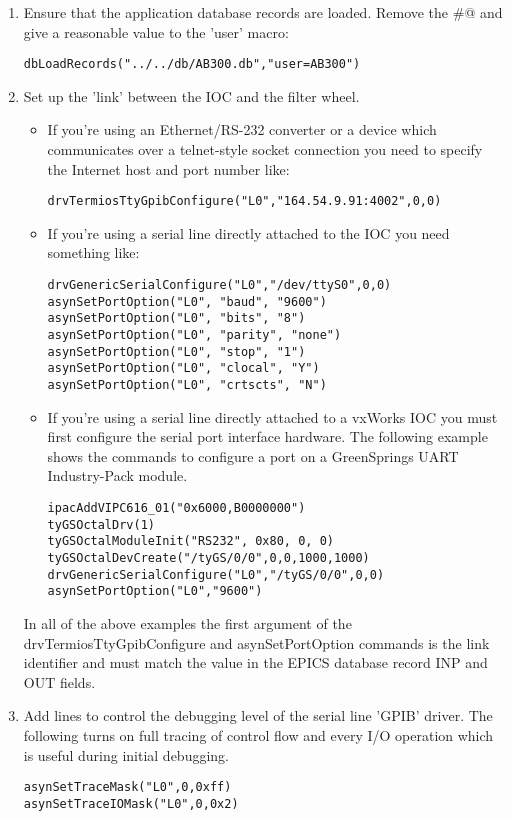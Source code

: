 \documentclass[twoside]{article}
\begin{document}
\begin{enumerate}
\item Ensure that the application database records are loaded.  Remove the
\verb@#@
and give a reasonable value to the 'user' macro:
\begin{verbatim}
dbLoadRecords("../../db/AB300.db","user=AB300")
\end{verbatim}

\item Set up the 'link' between the IOC and the filter wheel.
\begin{itemize}
\item If you're using
an Ethernet/RS-232 converter or a device which communicates over
a telnet-style socket connection you need to specify the Internet host and
port number like:
\begin{verbatim}
drvTermiosTtyGpibConfigure("L0","164.54.9.91:4002",0,0)
\end{verbatim}


\item If you're using a serial line directly attached to the IOC you need
something like:
\begin{verbatim}
drvGenericSerialConfigure("L0","/dev/ttyS0",0,0)
asynSetPortOption("L0", "baud", "9600")
asynSetPortOption("L0", "bits", "8")
asynSetPortOption("L0", "parity", "none")
asynSetPortOption("L0", "stop", "1")
asynSetPortOption("L0", "clocal", "Y")
asynSetPortOption("L0", "crtscts", "N")
\end{verbatim}

\item If you're using a serial line directly attached to a vxWorks IOC you must
first configure the serial port interface hardware.  The following example shows the
commands to configure a port on a GreenSprings UART Industry-Pack module.
\begin{verbatim}
ipacAddVIPC616_01("0x6000,B0000000")
tyGSOctalDrv(1)
tyGSOctalModuleInit("RS232", 0x80, 0, 0)
tyGSOctalDevCreate("/tyGS/0/0",0,0,1000,1000)
drvGenericSerialConfigure("L0","/tyGS/0/0",0,0)
asynSetPortOption("L0","9600")
\end{verbatim}
\end{itemize}

In all of the above examples the first argument of the
drvTermiosTtyGpibConfigure and asynSetPortOption commands is
the link identifier and must match the \verb@L@ value in the EPICS
database record INP and OUT fields.

\item Add lines to control the debugging level of the serial line 'GPIB' driver.
The following turns on full tracing of control flow and every I/O operation
which is useful during initial debugging.
\begin{verbatim}
asynSetTraceMask("L0",0,0xff)
asynSetTraceIOMask("L0",0,0x2)
\end{verbatim}

\end{enumerate}
\end{document}
